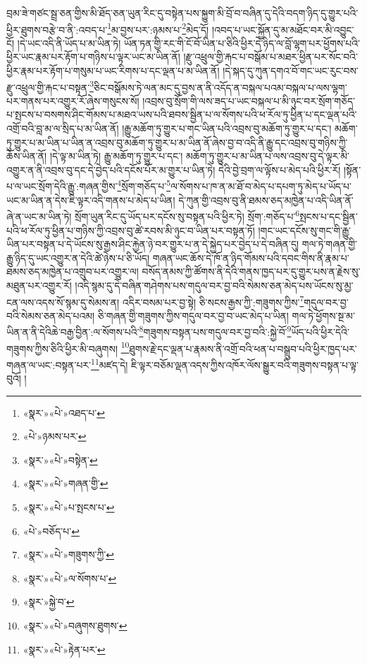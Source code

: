 བྲམ་ཟེ་གཙང་སྦྲ་ཅན་གྱིས་མི་ཐོད་ཅན་ཡུན་རིང་དུ་བསྟེན་པས་སྐྱུག་མི་བྲོ་བ་བཞིན་དུ་དེའི་བདག་ཉིད་དུ་གྱུར་པའི་ཕྱིར་ཐུགས་བརྩེ་བ་ནི་:འབད་པ་\footnote{«སྣར་»«པེ་»འཐད་པ་}མ་བྱས་པར་:ཉམས་པ་\footnote{«པེ་»ཉམས་པར་}མེད་དོ། །འབད་པ་ཡང་སྐྱོན་དུ་མ་མཐོང་བར་མི་འབྱུང་ངོ། །དེ་ཡང་འདི་ནི་ཡོད་པ་མ་ཡིན་ཏེ། ཡོན་ཏན་གྱི་རང་གི་ངོ་བོ་ཡིན་པ་ཅིའི་ཕྱིར་དེ་ཉིད་ལ་བློ་ལྷག་པར་ཕྱོགས་པའི་ཕྱིར་ཡང་རྣམ་པར་རྟོག་པ་གཉིས་པ་ལྟར་ཡང་མ་ཡིན་ནོ། །རྫུ་འཕྲུལ་གྱི་རྐང་པ་བསྒོམ་པ་མཐར་ཕྱིན་པར་སོང་བའི་ཕྱིར་རྣམ་པར་རྟོག་པ་གསུམ་པ་ཡང་རིགས་པ་དང་ལྡན་པ་མ་ཡིན་ནོ། །དེ་སྐད་དུ་ཀུན་དགའ་བོ་གང་ཡང་རུང་བས་རྫུ་འཕྲུལ་གྱི་རྐང་པ་བསྟན་\footnote{«སྣར་»«པེ་»བསྟེན་}ཅིང་བསྒོམས་ཏེ་ལན་མང་དུ་བྱས་ན་ནི་འདོད་ན་བསྐལ་པའམ་བསྐལ་པ་ལས་ལྷག་པར་གནས་པར་འགྱུར་རོ་ཞེས་གསུངས་སོ། །འབྲས་བུ་སྲོག་གི་ལས་ཟད་པ་ཡང་བསྐལ་པ་མི་ཉུང་བར་སྲོག་གཅོད་པ་སྤངས་པ་བསགས་ཤིང་གོམས་པ་མཐའ་ཡས་པའི་ཐབས་སྦྱིན་པ་ལ་སོགས་པའི་ཕ་རོལ་ཏུ་ཕྱིན་པ་དང་ལྡན་པའི་འགྲོ་བའི་བླ་མ་ལ་སྲིད་པ་མ་ཡིན་ནོ། །རྒྱུ་མཆོག་ཏུ་གྱུར་པ་གང་ཡིན་པའི་འབྲས་བུ་མཆོག་ཏུ་གྱུར་པ་དང་། མཆོག་ཏུ་གྱུར་པ་མ་ཡིན་པ་ཡིན་ན་འབྲས་བུ་མཆོག་ཏུ་གྱུར་པ་མ་ཡིན་ནོ་ཞེས་བྱ་བ་འདི་ནི་རྒྱུ་དང་འབྲས་བུ་གཉིས་ཀྱི་ཆོས་ཡིན་ནོ། །དེ་ལྟ་མ་ཡིན་ཏེ། རྒྱུ་མཆོག་ཏུ་གྱུར་པ་དང་། མཆོག་ཏུ་གྱུར་པ་མ་ཡིན་པ་ལས་འབྲས་བུ་དེ་ལྟར་མི་འགྱུར་ན་ནི་འབྲས་བུ་དང་དེ་བྱེད་པའི་དངོས་པོར་མ་གྱུར་པ་ཡིན་ཏེ། དེའི་བྱེ་བྲག་ལ་ལྟོས་པ་མེད་པའི་ཕྱིར་རོ། །སྟོན་པ་ལ་ཡང་སྲོག་དེའི་རྒྱུ་:གཞན་གྱིས་\footnote{«སྣར་»«པེ་»གཞན་གྱི་}སྲོག་གཅོད་པ་\footnote{«སྣར་»«པེ་»པ་སྤངས་པ་}ལ་སོགས་པ་ཁ་ན་མ་ཐོ་བ་མེད་པ་དཔག་ཏུ་མེད་པ་ཡོད་པ་ཡང་མ་ཡིན་ན་དེས་ཇི་ལྟར་འདི་གནས་པ་མེད་པ་ཡིན། དེ་ཀུན་གྱི་འབྲས་བུ་ནི་ཐམས་ཅད་མཁྱེན་པ་འདི་ཡིན་ནོ་ཞེ་ན་ཡང་མ་ཡིན་ཏེ། སྲོག་ཡུན་རིང་དུ་ཡོད་པར་དངོས་སུ་བསྟན་པའི་ཕྱིར་ཏེ། སྲོག་:གཅོད་པ་\footnote{«པེ་»བཅོད་པ་}སྤངས་པ་དང་སྦྱིན་པའི་ཕ་རོལ་ཏུ་ཕྱིན་པ་གཉིས་ཀྱི་འབྲས་བུ་ཚེ་རབས་མི་ཉུང་བ་ཡིན་པར་བསྟན་ཏོ། །གང་ཡང་དངོས་སུ་གང་གི་རྒྱུ་ཡིན་པར་བསྟན་པ་དེ་ཡོངས་སུ་རྒྱས་ཤིང་རྐྱེན་ཉེ་བར་གྱུར་པ་ན་དེ་སྐྱེད་པར་བྱེད་པ་དེ་བཞིན་དུ། གལ་ཏེ་གཞན་གྱི་རྒྱུ་ཉིད་དུ་ཡང་འགྱུར་ན་དེའི་ཚེ་ཉེས་པ་ཅི་ཡོད། གཞན་ཡང་ཆོས་དེ་ཁོ་ན་ཉིད་གོམས་པའི་དབང་གིས་ནི་རྣམ་པ་ཐམས་ཅད་མཁྱེན་པ་འགྲུབ་པར་འགྱུར་ལ། བསོད་ནམས་ཀྱི་ཚོགས་ནི་དེའི་གནས་ཁྱད་པར་དུ་གྱུར་པས་ན་རྗེས་སུ་མཐུན་པར་འགྱུར་རོ། །འདི་སྙམ་དུ་དེ་བཞིན་གཤེགས་པས་གདུལ་བར་བྱ་བའི་སེམས་ཅན་མེད་པས་ཡོངས་སུ་མྱ་ངན་ལས་འདས་སོ་སྙམ་དུ་སེམས་ན། འདིར་བསམ་པར་བྱ་སྟེ། ཅི་སངས་རྒྱས་ཀྱི་:གཟུགས་ཀྱིས་\footnote{«སྣར་»«པེ་»གཟུགས་ཀྱི་}གདུལ་བར་བྱ་བའི་སེམས་ཅན་མེད་པའམ། ཅི་གཞན་གྱི་གཟུགས་ཀྱིས་གདུལ་བར་བྱ་བ་ཡང་མེད་པ་ཡིན། གལ་ཏེ་ཕྱོགས་སྔ་མ་ཡིན་ན་ནི་དེའིཆེ་བརྒྱ་བྱིན་:ལ་སོགས་པའི་\footnote{«སྣར་»«པེ་»ལ་སོགས་པ་}གཟུགས་བསྟན་པས་གདུལ་བར་བྱ་བའི་:སྐྱེ་བོ་\footnote{«སྣར་»སྐྱེ་བ་}ཡོད་པའི་ཕྱིར་དེའི་གཟུགས་ཀྱིས་ཅིའི་ཕྱིར་མི་བཞུགས། \footnote{«སྣར་»«པེ་»བཞུགས་ཐུགས་}ཐུགས་རྗེ་དང་ལྡན་པ་རྣམས་ནི་འགྲོ་བའི་ཕན་པ་བསྒྲུབ་པའི་ཕྱིར་ཁྱད་པར་གཞན་ལ་ཡང་:བསྟན་པར་\footnote{«སྣར་»«པེ་»རྟེན་པར་}མཛད་དེ། ཇི་ལྟར་བཅོམ་ལྡན་འདས་ཀྱིས་འཁོར་ལོས་སྒྱུར་བའི་གཟུགས་བསྟན་པ་ལྟ་བུའོ། །
